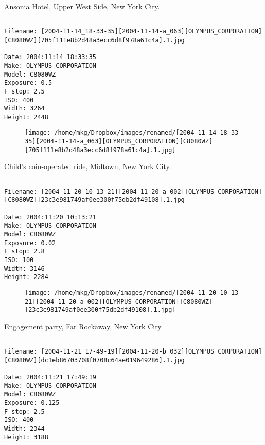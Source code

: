 \clearpage
\onecolumn
\noindent Ansonia Hotel, Upper West Side, New York City.
\noindent
\begin{lstlisting}

Filename: [2004-11-14_18-33-35][2004-11-14-a_063][OLYMPUS_CORPORATION][C8080WZ][705f111e8b2d48a3ecc6d8f978a61c4a].1.jpg

Date: 2004:11:14 18:33:35
Make: OLYMPUS CORPORATION
Model: C8080WZ
Exposure: 0.5
F stop: 2.5
ISO: 400
Width: 3264
Height: 2448
\end{lstlisting}
\clearpage

\begin{figure}
\texttt{[image: /home/mkg/Dropbox/images/renamed/[2004-11-14\_18-33-35][2004-11-14-a\_063][OLYMPUS\_CORPORATION][C8080WZ][705f111e8b2d48a3ecc6d8f978a61c4a].1.jpg]}
\end{figure}
    
\clearpage
\onecolumn
\noindent Child's coin-operated ride, Midtown, New York City.
\noindent
\begin{lstlisting}

Filename: [2004-11-20_10-13-21][2004-11-20-a_002][OLYMPUS_CORPORATION][C8080WZ][23c3e981749af0ee300f75db2df49108].1.jpg

Date: 2004:11:20 10:13:21
Make: OLYMPUS CORPORATION
Model: C8080WZ
Exposure: 0.02
F stop: 2.8
ISO: 100
Width: 3146
Height: 2284
\end{lstlisting}
\clearpage

\begin{figure}
\texttt{[image: /home/mkg/Dropbox/images/renamed/[2004-11-20\_10-13-21][2004-11-20-a\_002][OLYMPUS\_CORPORATION][C8080WZ][23c3e981749af0ee300f75db2df49108].1.jpg]}
\end{figure}
    
\clearpage
\onecolumn
\noindent Engagement party, Far Rockaway, New York City.
\noindent
\begin{lstlisting}

Filename: [2004-11-21_17-49-19][2004-11-20-b_032][OLYMPUS_CORPORATION][C8080WZ][dc1eb86703708f0708c64ae019649286].1.jpg

Date: 2004:11:21 17:49:19
Make: OLYMPUS CORPORATION
Model: C8080WZ
Exposure: 0.125
F stop: 2.5
ISO: 400
Width: 2344
Height: 3188
\end{lstlisting}
\clearpage

